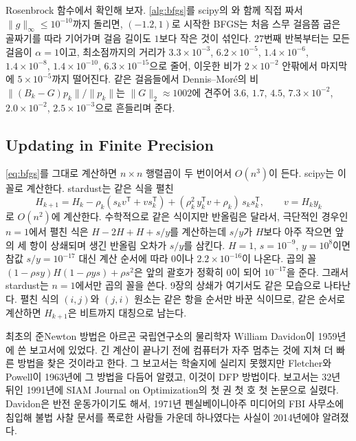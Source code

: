 Rosenbrock 함수에서 확인해 보자. \cref{alg:bfgs}를 scipy의 와 함께 직접 짜서 $\|g\|_\infty\le10^{-10}$까지 돌리면, $(-1.2,1)$로 시작한 BFGS는 처음 스무 걸음쯤 굽은 골짜기를 따라 기어가며 걸음 길이도 $1$보다 작은 것이 섞인다. $27$번째 반복부터는 모든 걸음이 $\alpha=1$이고, 최소점까지의 거리가 $3.3\times10^{-3}$, $6.2\times10^{-5}$, $1.4\times10^{-6}$, $1.4\times10^{-8}$, $1.4\times10^{-10}$, $6.3\times10^{-15}$으로 줄어, 이웃한 비가 $2\times10^{-2}$ 안팎에서 마지막에 $5\times10^{-5}$까지 떨어진다. 같은 걸음들에서 Dennis--Moré의 비 $\|(B_k-G)p_k\|/\|p_k\|$는 $\|G\|_2\approx1002$에 견주어 $3.6$, $1.7$, $4.5$, $7.3\times10^{-2}$, $2.0\times10^{-2}$, $2.5\times10^{-3}$으로 흔들리며 준다.

\subsection{Updating in Finite Precision}

\eqref{eq:bfgs}를 그대로 계산하면 $n\times n$ 행렬곱이 두 번이어서 $O(n^3)$이 든다. scipy는 이 꼴로 계산한다. stardust는 같은 식을 펼친
\[
H_{k+1}=H_k-\rho_k(s_kv^{\mathsf T}+vs_k^{\mathsf T})+(\rho_k^2\,y_k^{\mathsf T}v+\rho_k)\,s_ks_k^{\mathsf T},\qquad v=H_ky_k
\]
로 $O(n^2)$에 계산한다. 수학적으로 같은 식이지만 반올림은 달라서, 극단적인 경우인 $n=1$에서 펼친 식은 $H-2H+H+s/y$를 계산하는데 $s/y$가 $H$보다 아주 작으면 앞의 세 항이 상쇄되며 생긴 반올림 오차가 $s/y$를 삼킨다. $H=1$, $s=10^{-9}$, $y=10^8$이면 참값 $s/y=10^{-17}$ 대신 계산 순서에 따라 $0$이나 $2.2\times10^{-16}$이 나온다. 곱의 꼴 $(1-\rho sy)H(1-\rho ys)+\rho s^2$은 앞의 괄호가 정확히 $0$이 되어 $10^{-17}$을 준다. 그래서 stardust는 $n=1$에서만 곱의 꼴을 쓴다. 9장의 상쇄가 여기서도 같은 모습으로 나타난다. 펼친 식의 $(i,j)$와 $(j,i)$ 원소는 같은 항을 순서만 바꾼 식이므로, 같은 순서로 계산하면 $H_{k+1}$은 비트까지 대칭으로 남는다.

\begin{aside}
최초의 준Newton 방법은 아르곤 국립연구소의 물리학자 William Davidon이 1959년에 쓴 보고서에 있었다. 긴 계산이 끝나기 전에 컴퓨터가 자주 멈추는 것에 지쳐 더 빠른 방법을 찾은 것이라고 한다. 그 보고서는 학술지에 실리지 못했지만 Fletcher와 Powell이 1963년에 그 방법을 다듬어 알렸고\cite{fletcher1963}, 이것이 DFP 방법이다. 보고서는 32년 뒤인 1991년에 SIAM Journal on Optimization의 첫 권 첫 호 첫 논문으로 실렸다\cite{davidon1991}. Davidon은 반전 운동가이기도 해서, 1971년 펜실베이니아주 미디어의 FBI 사무소에 침입해 불법 사찰 문서를 폭로한 사람들 가운데 하나였다는 사실이 2014년에야 알려졌다.
\end{aside}

